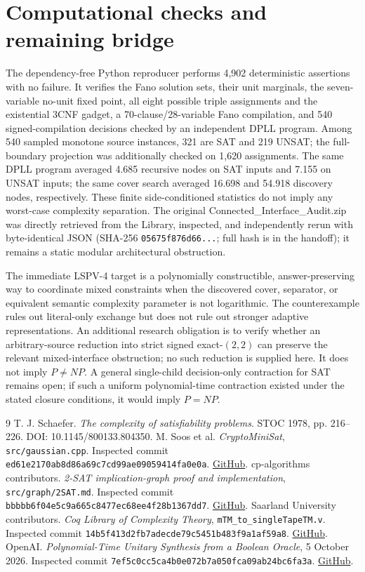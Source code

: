 \documentclass[11pt]{article}
\begin{document}
\section{Computational checks and remaining bridge}
The dependency-free Python reproducer performs 4,902 deterministic assertions with no failure. It verifies the Fano solution sets, their unit marginals, the seven-variable no-unit fixed point, all eight possible triple assignments and the existential 3CNF gadget, a 70-clause/28-variable Fano compilation, and 540 signed-compilation decisions checked by an independent DPLL program. Among 540 sampled monotone source instances, 321 are SAT and 219 UNSAT; the full-boundary projection was additionally checked on 1,620 assignments. The same DPLL program averaged 4.685 recursive nodes on SAT inputs and 7.155 on UNSAT inputs; the same cover search averaged 16.698 and 54.918 discovery nodes, respectively. These finite side-conditioned statistics do not imply any worst-case complexity separation. The original Connected\_Interface\_Audit.zip was directly retrieved from the Library, inspected, and independently rerun with byte-identical JSON (SHA-256 \texttt{05675f876d66...}; full hash is in the handoff); it remains a static modular architectural obstruction.

The immediate LSPV-4 target is a polynomially constructible, answer-preserving way to coordinate mixed constraints when the discovered cover, separator, or equivalent semantic complexity parameter is not logarithmic. The counterexample rules out literal-only exchange but does not rule out stronger adaptive representations. An additional research obligation is to verify whether an arbitrary-source reduction into strict signed exact-$(2,2)$ can preserve the relevant mixed-interface obstruction; no such reduction is supplied here. It does not imply $P\ne NP$. A general single-child decision-only contraction for SAT remains open; if such a uniform polynomial-time contraction existed under the stated closure conditions, it would imply $P=NP$.

\begin{thebibliography}{9}
 T. J. Schaefer. \emph{The complexity of satisfiability problems}. STOC 1978, pp. 216--226. DOI: 10.1145/800133.804350.
 M. Soos et al. \emph{CryptoMiniSat}, \texttt{src/gaussian.cpp}. Inspected commit \texttt{ed61e2170ab8d86a69c7cd99ae09059414fa0e0a}. \href{https://github.com/msoos/cryptominisat}{GitHub}.
 cp-algorithms contributors. \emph{2-SAT implication-graph proof and implementation}, \texttt{src/graph/2SAT.md}. Inspected commit \texttt{bbbbb6f04e5c9a665c8477ec68ee4f28b1367dd7}. \href{https://github.com/cp-algorithms/cp-algorithms}{GitHub}.
 Saarland University contributors. \emph{Coq Library of Complexity Theory}, \texttt{mTM\_to\_singleTapeTM.v}. Inspected commit \texttt{14b5f413d2fb7adecde79c5451b483f9a1af59a8}. \href{https://github.com/uds-psl/coq-library-complexity}{GitHub}.
 OpenAI. \emph{Polynomial-Time Unitary Synthesis from a Boolean Oracle}, 5 October 2026. Inspected commit \texttt{7ef5c0cc5ca4b0e072b7a050fca09ab24bc6fa3a}. \href{https://github.com/openai/math}{GitHub}.
\end{thebibliography}
\end{document}
